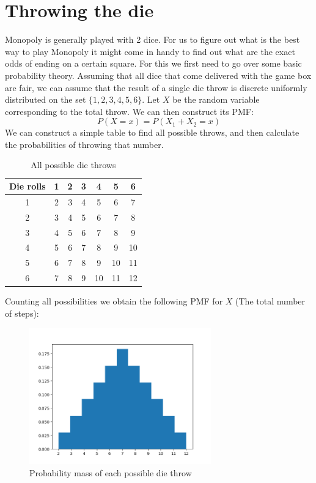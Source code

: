 \documentclass{article}
\begin{document}
\section{Throwing the die}
Monopoly is generally played with 2 dice. For us to figure out what is the best way to play Monopoly it might come in handy to find out what are the exact odds of ending on a certain square. For this we first need to go over some basic probability theory. Assuming that all dice that come delivered with the game box are fair, we can assume that the result of a single die throw is discrete uniformly distributed on the set $\{1,2,3,4,5,6\}$. Let $X$ be the random variable corresponding to the total throw. We can then construct its PMF:
$$P(X = x) = P(X_1 + X_2 = x)$$
We can construct a simple table to find all possible throws, and then calculate the probabilities of throwing that number.


\begin{table}[h]
\centering
\begin{tabular}{|c|c|c|c|c|c|c|}
 Die rolls& 1 & 2 & 3 & 4 & 5 & 6 \\
 \hline
 1& 2 & 3 & 4 & 5 & 6 & 7\\
 \hline
 2& 3 & 4 & 5 & 6 & 7 & 8\\
 \hline
 3& 4 & 5 & 6 & 7 & 8 & 9\\
 \hline
 4& 5 & 6 & 7 & 8 & 9 & 10\\
 \hline
 5& 6 & 7 & 8 & 9 & 10 & 11\\
 \hline
 6& 7 & 8 & 9 & 10 & 11 & 12\\
\end{tabular}
\caption{All possible die throws}
\end{table}

Counting all possibilities we obtain the following PMF for $X$ (The total number of steps):

\begin{figure}[h]
\centering
\includegraphics[width = 0.7\textwidth]{die_roll_histogram.png}
\caption{Probability mass of each possible die throw}
\end{figure}
\end{document}
